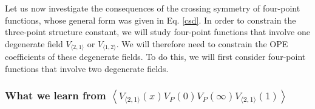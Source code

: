 \documentclass[12pt, a4paper, notitlepage, twoside]{report}
\numberwithin{equation}{section}
\theoremstyle{break}
\begin{document}
Let us now investigate the consequences of the crossing symmetry of four-point functions, whose general form was given in Eq. \eqref{csd}. In order to constrain the three-point structure constant, we will study four-point functions that involve one degenerate field $V_{\langle 2,1\rangle}$ or $V_{\langle 1, 2\rangle}$. We will therefore need to constrain the OPE coefficients of these degenerate fields. 
To do this, we will first consider four-point functions that involve two degenerate fields. 


\subsubsection{What we learn from $
 \left\langle V_{\langle 2,1 \rangle}(x) V_P(0) V_{P}(\infty) V_{\langle 2,1 \rangle}(1) \right\rangle$}
 
\end{document}
